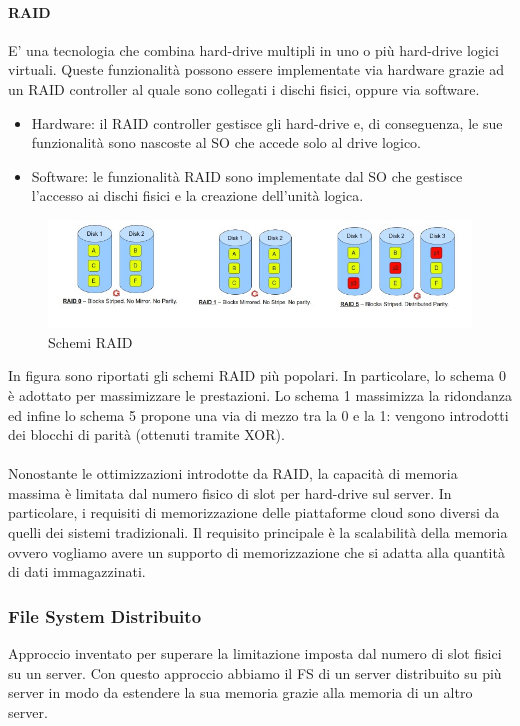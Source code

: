 \documentclass{article}
\begin{document}
\paragraph{RAID} E' una tecnologia che combina hard-drive multipli in uno o più hard-drive logici virtuali. Queste funzionalità possono essere implementate via hardware grazie ad un RAID controller al quale sono collegati i dischi fisici, oppure via software.
\begin{itemize}
    \item Hardware: il RAID controller gestisce gli hard-drive e, di conseguenza, le sue funzionalità sono nascoste al SO che accede solo al drive logico.
    \item Software: le funzionalità RAID sono implementate dal SO che gestisce l'accesso ai dischi fisici e la creazione dell'unità logica.
\end{itemize}

\begin{figure}[H]
    \centering
    \includegraphics[scale=0.7]{img/raid.jpg}
    \caption{Schemi RAID}
\end{figure}\noindent
In figura sono riportati gli schemi RAID più popolari. In particolare, lo schema 0 è adottato per massimizzare le prestazioni. Lo schema 1 massimizza la ridondanza ed infine lo schema 5 propone una via di mezzo tra la 0 e la 1: vengono introdotti dei blocchi di parità (ottenuti tramite XOR).\\ \\
Nonostante le ottimizzazioni introdotte da RAID, la capacità di memoria massima è limitata dal numero fisico di slot per hard-drive sul server. In particolare, i requisiti di memorizzazione delle piattaforme cloud sono diversi da quelli dei sistemi tradizionali. Il requisito principale è la scalabilità della memoria ovvero vogliamo avere un supporto di memorizzazione che si adatta alla quantità di dati immagazzinati.

\subsubsection{File System Distribuito}
Approccio inventato per superare la limitazione imposta dal numero di slot fisici su un server. Con questo approccio abbiamo il FS di un server distribuito su più server in modo da estendere la sua memoria grazie alla memoria di un altro server.
\end{document}

